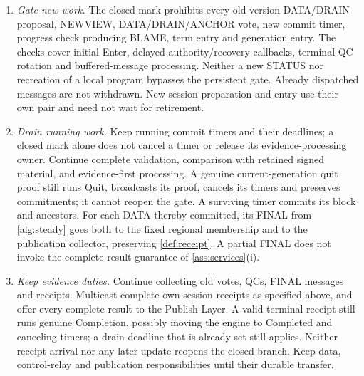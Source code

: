\documentclass[11pt,a4paper]{article}
\begin{document}
\begin{enumerate}[label=(\roman*),itemsep=2pt]
closure evidence and a pending relay obligation. The entry gate is already shut,
but $c_v$ is not assigned and no $4\Delta$ clock is invented.
Whenever any old-pair ReadyBundle, proposal, authority, history or other packet
provides the missing authenticated snapshot context, the Session Manager
completes and multicasts the close bundle in that receive
handler, and replies with it to the packet's sender. Do this before
ordinary BFT processing, rejecting a live-entry request, discarding a
duplicate, or returning a Terminated/tombstone result. Historical
context is validated without requiring that the old version remain
open. Complete proposals from correct voters carry or resolve this
context within the complete-message bound. This handler is
mandatory even if the old program was never created, its ReadyBundle
is refused, or a delayed callback arrives after exit or restart.
\item \emph{Gate new work.} The closed mark prohibits every old-version
DATA/DRAIN proposal, NEWVIEW, DATA/DRAIN/ANCHOR vote, new commit timer,
progress check producing BLAME, term entry and generation entry.
The checks cover initial Enter, delayed authority/recovery callbacks,
terminal-QC rotation and buffered-message processing. Neither a new
STATUS nor recreation of a local program bypasses the persistent gate.
Already dispatched messages are not withdrawn. New-session preparation
and entry use their own pair and need not wait for retirement.
\item \emph{Drain running work.} Keep running commit timers and
their deadlines; a closed mark alone does not cancel a
timer or release its evidence-processing owner. Continue complete
validation, comparison with retained signed material, and evidence-first
processing. A genuine current-generation quit proof still runs Quit,
broadcasts its proof, cancels its timers and preserves commitments;
it cannot reopen the gate. A surviving timer commits its block and
ancestors. For each DATA thereby committed, its FINAL from \cref{alg:steady} goes
both to the fixed regional membership and to the publication collector,
preserving \cref{def:receipt}. A partial FINAL does not invoke the
complete-result guarantee of \cref{ass:services}(i).
\item \emph{Keep evidence duties.} Continue collecting old votes, QCs,
FINAL messages and receipts. Multicast complete own-session receipts
as specified above, and offer every complete result to the Publish
Layer. A valid terminal receipt still runs genuine Completion,
possibly moving the engine to Completed and canceling timers; a
drain deadline that is already set still applies. Neither receipt arrival nor
any later update reopens the closed branch. Keep data, control-relay and publication
responsibilities until their durable transfer.
\end{enumerate}
\end{document}
